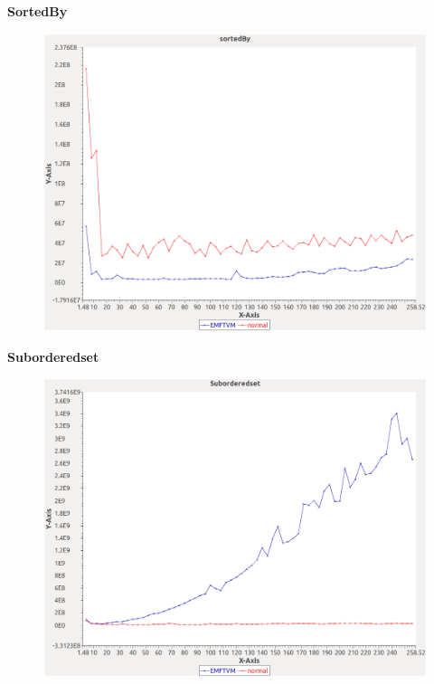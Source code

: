 \noindent\textbf{SortedBy}

\begin{figure}[h]
\centering
\includegraphics[width=\textwidth]{../graphs/orderedset/sortedBy}
\end{figure}
\pagebreak

\noindent\textbf{Suborderedset}

\begin{figure}[h]
\centering
\includegraphics[width=\textwidth]{../graphs/orderedset/Suborderedset}
\end{figure}
\pagebreak

